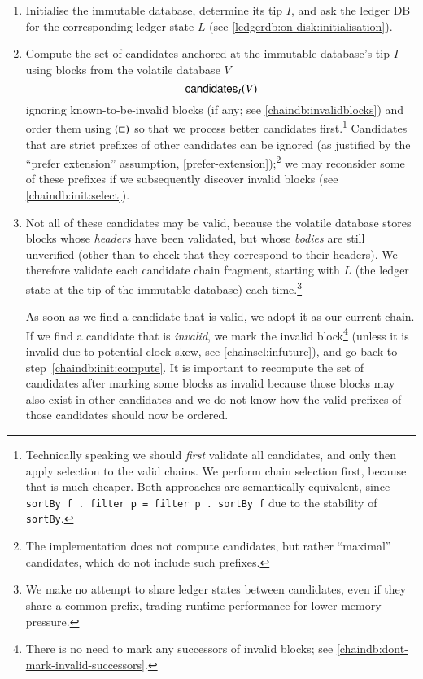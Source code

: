 \begin{enumerate}

\item
\label{chaindb:init:imm}
Initialise the immutable database, determine its tip $I$, and ask the ledger DB
for the corresponding ledger state $L$ (see
\cref{ledgerdb:on-disk:initialisation}).

\item Compute the set of candidates anchored at the immutable database's tip
\label{chaindb:init:compute}
$I$ using blocks from the volatile database $V$
$$\mathsf{candidates}_I(V)$$
ignoring known-to-be-invalid blocks (if any; see \cref{chaindb:invalidblocks})
and order them using $(\mathrel{\sqsubset})$  so that we process better candidates
first.\footnote{Technically speaking we should \emph{first} validate all
candidates, and only then apply selection to the valid chains. We perform chain
selection first, because that is much cheaper. Both approaches are semantically
equivalent, since \lstinline!sortBy f . filter p = filter p . sortBy f! due to
the stability of \lstinline!sortBy!.} Candidates that are strict prefixes of
other candidates can be ignored (as justified by the ``prefer extension''
assumption, \cref{prefer-extension});\footnote{The implementation does not
compute candidates, but rather ``maximal'' candidates, which do not include such
prefixes.} we may reconsider some of these prefixes if we subsequently discover
invalid blocks (see \cref{chaindb:init:select}).

\item
\label{chaindb:init:select}
Not all of these candidates may be valid, because the volatile database stores
blocks whose \emph{headers} have been validated, but whose \emph{bodies} are
still unverified (other than to check that they correspond to their headers).
We therefore validate each candidate chain fragment, starting with $L$ (the
ledger state at the tip of the immutable database) each time.\footnote{We make
no attempt to share ledger states between candidates, even if they share a
common prefix, trading runtime performance for lower memory pressure.}

As soon as we find a candidate that is valid, we adopt it as our current chain.
If we find a candidate that is \emph{invalid}, we mark the invalid
block\footnote{There is no need to mark any successors of invalid blocks; see
\cref{chaindb:dont-mark-invalid-successors}.} (unless it is invalid due to
potential clock skew, see \cref{chainsel:infuture}), and go back to
step~\ref{chaindb:init:compute}. It is important to recompute the set of
candidates after marking some blocks as invalid because those blocks may also
exist in other candidates and we do not know how the valid prefixes of those
candidates should now be ordered.

\end{enumerate}

